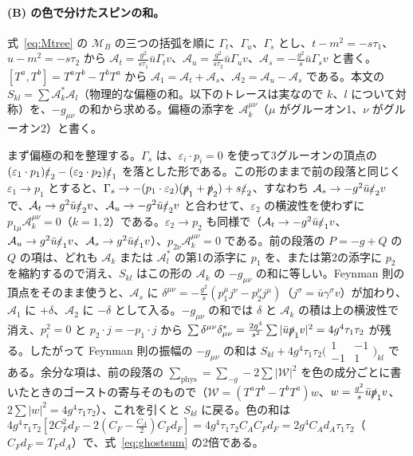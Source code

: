 \documentclass[a4paper,10pt]{ltjsarticle}
\begin{document}
\paragraph{(B) の色で分けたスピンの和。}式~\eqref{eq:Mtree} の $\mathcal M_B$ の三つの括弧を順に $\Gamma_t$、$\Gamma_u$、$\Gamma_s$ とし、$t-m^2=-s\tau_1$、$u-m^2=-s\tau_2$ から $\mathcal A_t=\frac{g^2}{s\tau_1}\bar u\Gamma_tv$、$\mathcal A_u=\frac{g^2}{s\tau_2}\bar u\Gamma_uv$、$\mathcal A_s=-\frac{g^2}{s}\bar u\Gamma_sv$ と書く。$[T^a,T^b]=T^aT^b-T^bT^a$ から $\mathcal A_1=\mathcal A_t+\mathcal A_s$、$\mathcal A_2=\mathcal A_u-\mathcal A_s$ である。本文の $S_{kl}=\sum\mathcal A_k^*\mathcal A_l$（物理的な偏極の和。以下のトレースは実なので $k$、$l$ について対称）を、$-g_{\mu\nu}$ の和から求める。偏極の添字を $\mathcal A_k^{\mu\nu}$（$\mu$ がグルーオン1、$\nu$ がグルーオン2）と書く。

まず偏極の和を整理する。$\Gamma_s$ は、$\varepsilon_i\cdot p_i=0$ を使って3グルーオンの頂点の $(\varepsilon_1\cdot p_1)\slashed\varepsilon_2-(\varepsilon_2\cdot p_2)\slashed\varepsilon_1$ を落とした形である。この形のままで前の段落と同じく $\varepsilon_1\to p_1$ とすると、$\Gamma_s\to-(p_1\cdot\varepsilon_2)(\slashed p_1+\slashed p_2)+s\slashed\varepsilon_2$、すなわち $\mathcal A_s\to-g^2\bar u\slashed\varepsilon_2v$ で、$\mathcal A_t\to g^2\bar u\slashed\varepsilon_2v$、$\mathcal A_u\to-g^2\bar u\slashed\varepsilon_2v$ と合わせて、$\varepsilon_2$ の横波性を使わずに $p_{1\mu}\mathcal A_k^{\mu\nu}=0$（$k=1,2$）である。$\varepsilon_2\to p_2$ も同様で（$\mathcal A_t\to-g^2\bar u\slashed\varepsilon_1v$、$\mathcal A_u\to g^2\bar u\slashed\varepsilon_1v$、$\mathcal A_s\to g^2\bar u\slashed\varepsilon_1v$）、$p_{2\nu}\mathcal A_k^{\mu\nu}=0$ である。前の段落の $P=-g+Q$ の $Q$ の項は、どれも $\mathcal A_k$ または $\mathcal A_l^*$ の第1の添字に $p_1$ を、または第2の添字に $p_2$ を縮約するので消え、$S_{kl}$ はこの形の $\mathcal A_k$ の $-g_{\mu\nu}$ の和に等しい。Feynman 則の頂点をそのまま使うと、$\mathcal A_s$ に $\delta^{\mu\nu}=-\frac{g^2}{s}(p_1^\mu j^\nu-p_2^\nu j^\mu)$（$j^\sigma=\bar u\gamma^\sigma v$）が加わり、$\mathcal A_1$ に $+\delta$、$\mathcal A_2$ に $-\delta$ として入る。$-g_{\mu\nu}$ の和では $\delta$ と $\mathcal A_k$ の積は上の横波性で消え、$p_i^2=0$ と $p_2\cdot j=-p_1\cdot j$ から $\sum\delta^{\mu\nu}\delta^*_{\mu\nu}=\frac{2g^4}{s^2}\sum|\bar u\slashed p_1v|^2=4g^4\tau_1\tau_2$ が残る。したがって Feynman 則の振幅の $-g_{\mu\nu}$ の和は $S_{kl}+4g^4\tau_1\tau_2\bigl(\begin{smallmatrix}1&-1\\-1&1\end{smallmatrix}\bigr)_{kl}$ である。余分な項は、前の段落の $\sum_{\mathrm{phys}}=\sum_{-g}-2\sum|\mathcal W|^2$ を色の成分ごとに書いたときのゴーストの寄与そのもので（$\mathcal W=(T^aT^b-T^bT^a)w$、$w=\frac{g^2}s\bar u\slashed p_1v$、$2\sum|w|^2=4g^4\tau_1\tau_2$）、これを引くと $S_{kl}$ に戻る。色の和は $4g^4\tau_1\tau_2[2C_F^2d_F-2(C_F-\frac{C_A}2)C_Fd_F]=4g^4\tau_1\tau_2C_AC_Fd_F=2g^4C_Ad_A\tau_1\tau_2$（$C_Fd_F=T_Fd_A$）で、式~\eqref{eq:ghostsum} の2倍である。
\end{document}
